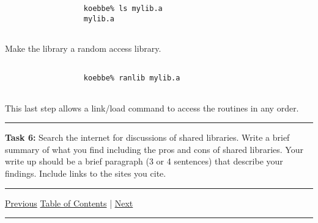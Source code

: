 \documentclass[10pt,fleqn]{article}
\begin{document}
\begin{trivlist}
\begin{trivlist}
\begin{verbatim}
                  koebbe% ls mylib.a
                  mylib.a
                
                \end{verbatim}
          \item Make the library a random access library.
                \begin{verbatim}

                  koebbe% ranlib mylib.a
                
                \end{verbatim}
                This last step allows a link/load command to access the routines
                in any order.
        \end{trivlist}
\vskip0.1in\hrule\vskip0.1in \noindent
  \item[\bf Task 6:] Search the internet for discussions of shared libraries.
        Write a brief summary of what you find including the pros and cons of
        shared libraries. Your write up should be a brief paragraph (3 or 4
        sentences) that describe your findings. Include links to the sites you
        cite.
\end{trivlist}
\vskip0.1in\hrule\vskip0.1in \noindent
  \href{../../tasksheet_02/html/tasksheet_02.html}{Previous}
  \href{../../toc/md/tasksheet_toc.md}{Table of Contents} |
  \href{../../tasksheet_04/html/tasksheet_04.html}{Next}
\vskip0.1in\hrule\vskip0.1in \noindent
\end{document}
